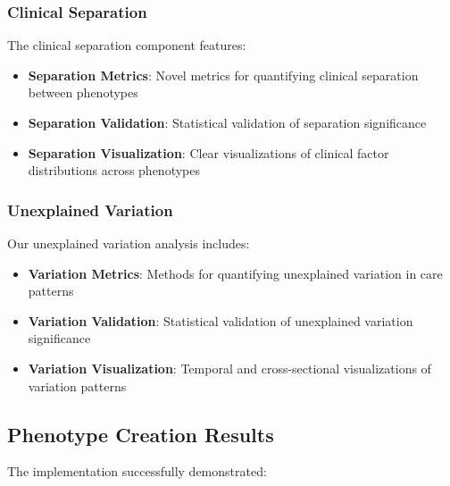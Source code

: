 \documentclass[12pt]{article}
\begin{document}
\subsubsection{Clinical Separation}

The clinical separation component features:
\begin{itemize}
    \item \textbf{Separation Metrics}: Novel metrics for quantifying clinical separation between phenotypes
    \item \textbf{Separation Validation}: Statistical validation of separation significance
    \item \textbf{Separation Visualization}: Clear visualizations of clinical factor distributions across phenotypes
\end{itemize}

\subsubsection{Unexplained Variation}

Our unexplained variation analysis includes:
\begin{itemize}
    \item \textbf{Variation Metrics}: Methods for quantifying unexplained variation in care patterns
    \item \textbf{Variation Validation}: Statistical validation of unexplained variation significance
    \item \textbf{Variation Visualization}: Temporal and cross-sectional visualizations of variation patterns
\end{itemize}

\subsection{Phenotype Creation Results}

The implementation successfully demonstrated:
\end{document}

